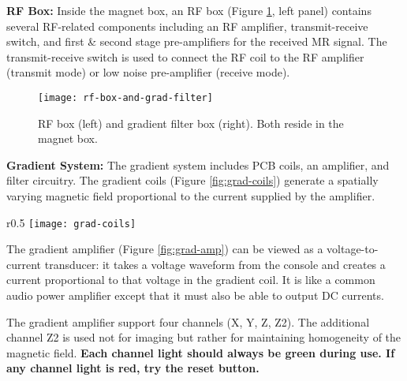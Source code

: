\vspace{5mm}

\noindent\textbf{RF Box:} Inside the magnet box, an RF box (Figure \ref{fig:rf-box-and-grad-filter}, left panel) contains several RF-related components including an RF amplifier, transmit-receive switch, and first \& second stage pre-amplifiers for the received MR signal.  The transmit-receive switch is used to connect the RF coil to the RF amplifier (transmit mode) or low noise pre-amplifier (receive mode).

 \begin{figure}[h]
    \centering
    \texttt{[image: rf-box-and-grad-filter]}
    \caption{\label{fig:rf-box-and-grad-filter} RF box (left) and gradient filter box (right). Both reside in the magnet box.}
    \vspace{-2mm}
\end{figure}

\vspace{5mm}

\noindent\textbf{Gradient System:} The gradient system includes PCB coils, an amplifier, and filter circuitry. The gradient coils (Figure \ref{fig:grad-coils}) generate a spatially varying magnetic field proportional to the current supplied by the amplifier.

\begin{wrapfigure}{r}{0.5\textwidth}%
    \centering
    \texttt{[image: grad-coils]}
    \caption{\label{fig:grad-coils} PCB gradient coils.}
\end{wrapfigure}

\vspace{5mm}

The gradient amplifier (Figure \ref{fig:grad-amp}) can be viewed as a voltage-to-current transducer: it takes a voltage waveform from the console and creates a current proportional to that voltage in the gradient coil. It is like a common audio power amplifier except that it must also be able to output DC currents.

The gradient amplifier support four channels (X, Y, Z, Z2). The additional channel Z2 is used not for imaging but rather for maintaining homogeneity of the magnetic field. \textbf{Each channel light should always be green during use. If any channel light is red, try the reset button.}

